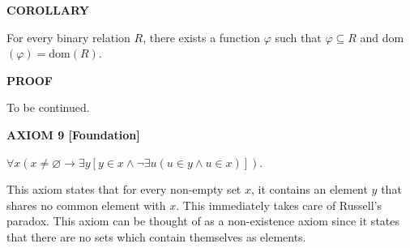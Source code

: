 \documentclass[12pt, a4paper]{article}
\begin{document}
\vspace{4mm}

\noindent\blacksquare\textbf{ COROLLARY}

\vspace{4mm}

For every binary relation $R$, there exists a function $\varphi$ such that $\varphi\subseteq R$ and dom$(\varphi)=$dom$(R)$.\par

\vspace{4mm}

\noindent\textbf{PROOF}

\vspace{4mm}

To be continued.\par

\vspace{6mm}

\noindent\blacksquare\textbf{ AXIOM 9 [Foundation]}

\vspace{4mm}

$\forall x(x\neq\varnothing\rightarrow\exists y[y\in x\wedge\neg\exists u(u\in y\wedge u\in x)])$.\par

\vspace{4mm}

\noindent This axiom states that for every non-empty set $x$, it contains an element $y$ that shares no common element with $x$. This immediately takes care of Russell's paradox. This axiom can be thought of as a non-existence axiom since it states that there are no sets which contain themselves as elements. 
\end{document}
